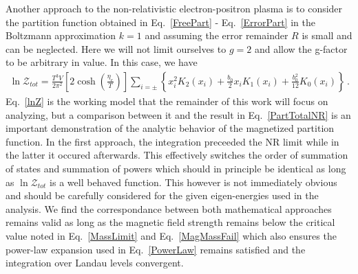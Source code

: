 \documentclass[Universe,article,submit,moreauthors,pdftex]{Definitions/mdpi}
\newcommand*{\req}[1]{Eq.~{\eqref{#1}}}
\newcommand*{\xred}{\color{red}}
\begin{document}
Another approach to the non-relativistic electron-positron plasma is to consider the partition function obtained in \req{FreePart} - \req{ErrorPart} in the Boltzmann approximation $k=1$ and assuming the error remainder $R$ is small and can be neglected. Here we will not limit ourselves to $g=2$ and allow the g-factor to be arbitrary in value. In this case, we have
\begin{align}
  \label{lnZ}
  \ln\mathcal{Z}_{tot}=\frac{T^3V}{2\pi^2}\left[2\cosh\left(\frac{\eta_{e}}{T}\right)\right]\sum_{i=\pm}\left\{x_i^{2} K_2\left(x_i\right)+\frac{b_0}{2}x_iK_1\left(x_i\right)+\frac{b^2_0}{12}K_0\left(x_i\right)\right\}\,.
\end{align}
\req{lnZ} is the working model that the remainder of this work will focus on analyzing, but a comparison between it and the result in \req{PartTotalNR} is an important demonstration of the analytic behavior of the magnetized partition function. In the first approach, the integration preceeded the NR limit while in the latter it occured afterwards. This effectively switches the order of summation of states and summation of powers which should in principle be identical as long as $\ln\mathcal{Z}_{tot}$ is a well behaved function. This however is not immediately obvious and should be carefully considered for the given eigen-energies used in the analysis. We find the correspondance between both mathematical approaches remains valid as long as the magnetic field strength remains below the critical value noted in \req{MassLimit} and \req{MagMassFail} which also ensures the power-law expansion used in \req{PowerLaw} remains satisfied and the integration over Landau levels convergent.
\end{document}

